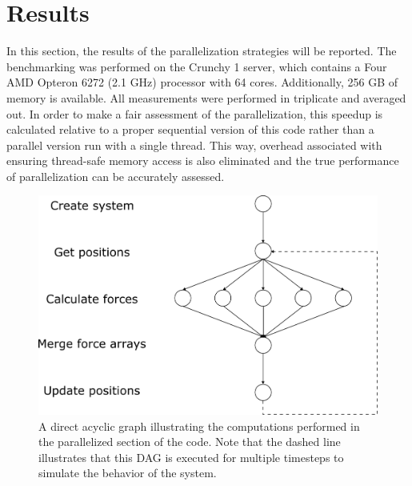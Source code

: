 \documentclass[conference]{IEEEtran}
\begin{document}
\section{Results}\label{res}
In this section, the results of the parallelization strategies will be reported. The benchmarking was performed on the
Crunchy 1 server, which contains a Four AMD Opteron 6272 (2.1 GHz) processor with 64 cores. Additionally, 256 GB of
memory is available. All measurements were performed in triplicate and averaged out. In order to 
make a fair assessment of the parallelization, this speedup is calculated relative to a proper sequential version
of this code rather than a parallel version run with a single thread. This way, overhead associated with ensuring
thread-safe memory access is also eliminated and the true performance of parallelization can be accurately assessed.
\begin{figure}[H]
    \centering
    \includegraphics[width=\linewidth]{./images/dag.png} %
    \caption{A direct acyclic graph illustrating the computations performed in the parallelized section of the code.
    Note that the dashed line illustrates that this DAG is executed for multiple timesteps to simulate the 
    behavior of the system.}\label{fig:dag}
\end{figure}
\end{document}
